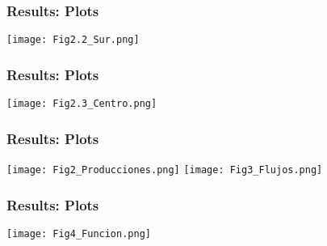 \documentclass[
11pt, %
]{beamer}
\begin{document}
	
	\begin{frame}
		\frametitle{Results: Plots}
		
		\begin{center}
			\texttt{[image: Fig2.2\_Sur.png]}
		\end{center}
		
	\end{frame}
	
	
	\begin{frame}
		\frametitle{Results: Plots}
		
		\begin{center}
			\texttt{[image: Fig2.3\_Centro.png]}
		\end{center}
		
	\end{frame}
	
	
	\begin{frame}
		\frametitle{Results: Plots}
		\texttt{[image: Fig2\_Producciones.png]}
		\texttt{[image: Fig3\_Flujos.png]}
		
	\end{frame}
	
	
	\begin{frame}
		\frametitle{Results: Plots}
		
		\begin{center}
			\texttt{[image: Fig4\_Funcion.png]}
		\end{center}
		
	\end{frame}

	
\end{document}
